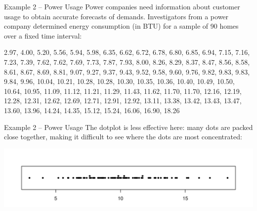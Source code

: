 \documentclass{beamer}
\begin{document}
\begin{frame}{Example 2 -- Power Usage}
Power companies need information about customer usage to obtain accurate forecasts of demands. Investigators from a power company determined energy consumption (in BTU) for a sample of 90 homes over a fixed time interval:

\vspace{.5cm}
2.97,
4.00,
5.20,
5.56,
5.94,
5.98,
6.35,
6.62,
6.72,
6.78,
6.80,
6.85,
6.94,
7.15,
7.16,
7.23,
7.39,
7.62,
7.62,
7.69,
7.73,
7.87,
7.93,
8.00,
8.26,
8.29,
8.37,
8.47,
8.56,
8.58,
8.61,
8.67,
8.69,
8.81,
9.07,
9.27,
9.37,
9.43,
9.52,
9.58,
9.60,
9.76,
9.82,
9.83,
9.83,
9.84,
9.96,
10.04,
10.21,
10.28,
10.28,
10.30,
10.35,
10.36,
10.40,
10.49,
10.50,
10.64,
10.95,
11.09,
11.12,
11.21,
11.29,
11.43,
11.62,
11.70,
11.70,
12.16,
12.19,
12.28,
12.31,
12.62,
12.69,
12.71,
12.91,
12.92,
13.11,
13.38,
13.42,
13.43,
13.47,
13.60,
13.96,
14.24,
14.35,
15.12,
15.24,
16.06,
16.90,
18.26
\end{frame}


\begin{frame}{Example 2 -- Power Usage}
The dotplot is less effective here: many dots are packed close together, making it difficult to see where the dots are most concentrated:

\includegraphics[scale=.5]{ch01_power_dot_stack.pdf}
\end{frame}
\end{document}
